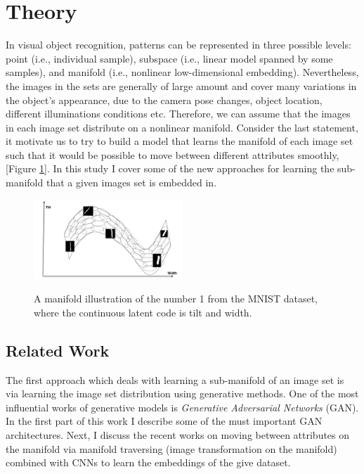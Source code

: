 \documentclass[letterpaper,12pt]{article}
\begin{document}
\section{Theory}
In visual object recognition, patterns can be represented in three possible levels: point (i.e., individual sample), subspace (i.e., linear model spanned by some samples), and manifold (i.e., nonlinear low-dimensional embedding). Nevertheless, the images in the sets are generally of large amount and cover many variations in the object’s appearance, due to the camera pose changes, object location, different illuminations conditions etc. Therefore, we can assume that the images in each image set distribute on a nonlinear manifold. Consider the last statement, it motivate us to try to build a model that learns the manifold of each image set such that it would be possible to move between different attributes smoothly, [Figure \ref{MNIST manifold }]. In this study I cover some of the new approaches for learning the sub-manifold that a given images set is embedded in.
 \begin{figure}[H]
\centering
\includegraphics[width=0.5\textwidth]{manifold_mnist_1}
\caption{\label{MNIST manifold }}A manifold illustration of the number 1 from the MNIST dataset, where the continuous latent code is tilt and width.
\end{figure}
\subsection*{ Related Work}
The first approach which deals with learning a sub-manifold of an image set is via learning the image set distribution using generative methods. One of the most influential works of generative models is \textit{Generative Adversarial Networks} (GAN). In the first part of this work I describe some of the must important GAN architectures. Next, I discuss the recent works on moving between attributes on the manifold \cite{deeptraverse} via manifold traversing (image transformation on the manifold) combined with CNNs to learn the embeddings of the give dataset.
\linebreak\vspace{5mm}
\end{document}
